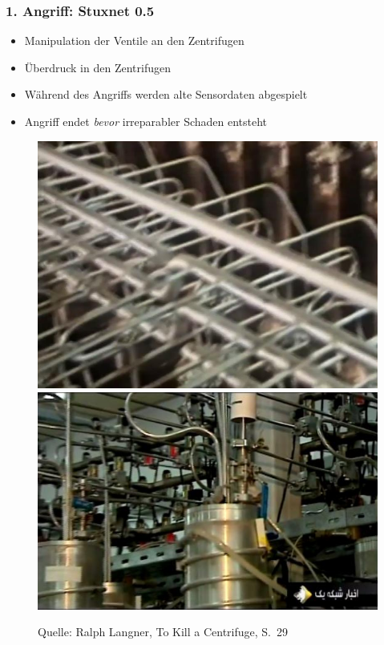 \documentclass{beamer}
\begin{document}
\begin{frame}
  \frametitle{1. Angriff: Stuxnet 0.5}
  \begin{itemize}
    \item Manipulation der Ventile an den Zentrifugen
    \item Überdruck in den Zentrifugen
    \item Während des Angriffs werden alte Sensordaten abgespielt
    \item Angriff endet \emph{bevor} irreparabler Schaden entsteht
  \end{itemize}
  \begin{figure}[b]
    \centering
    \includegraphics[height=0.3\textheight]{../Cascade-Urenco.png}
    \vspace{-0.3\textheight}
    \includegraphics[height=0.3\textheight]{../Cascade-Natanz.png}
    \vspace{0.3\textheight}
    
    \tiny{Quelle: Ralph Langner, To Kill a Centrifuge, S.~29}
  \end{figure}
\end{frame}
\end{document}
